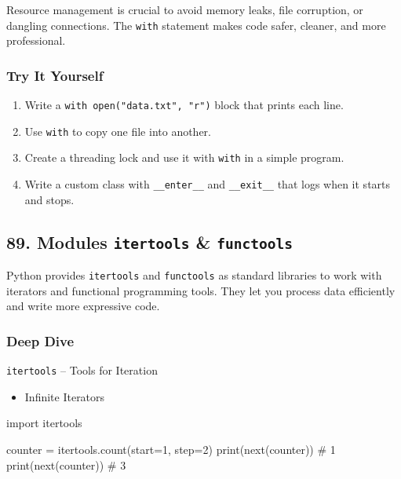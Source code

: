 \documentclass[
  letterpaper,
  DIV=11,
  numbers=noendperiod]{scrreprt}
\newenvironment{Shaded}{\begin{snugshade}}{\end{snugshade}}
\newcommand{\BuiltInTok}[1]{\textcolor[rgb]{0.00,0.23,0.31}{#1}}
\newcommand{\CommentTok}[1]{\textcolor[rgb]{0.37,0.37,0.37}{#1}}
\newcommand{\DecValTok}[1]{\textcolor[rgb]{0.68,0.00,0.00}{#1}}
\newcommand{\ImportTok}[1]{\textcolor[rgb]{0.00,0.46,0.62}{#1}}
\newcommand{\NormalTok}[1]{\textcolor[rgb]{0.00,0.23,0.31}{#1}}
\newcommand{\OperatorTok}[1]{\textcolor[rgb]{0.37,0.37,0.37}{#1}}
\providecommand{\tightlist}{%
  \setlength{\itemsep}{0pt}\setlength{\parskip}{0pt}}
\begin{document}
Resource management is crucial to avoid memory leaks, file corruption,
or dangling connections. The \texttt{with} statement makes code safer,
cleaner, and more professional.

\subsubsection{Try It Yourself}\label{try-it-yourself-87}

\begin{enumerate}
\def\labelenumi{\arabic{enumi}.}
\tightlist
\item
  Write a \texttt{with\ open("data.txt",\ "r")} block that prints each
  line.
\item
  Use \texttt{with} to copy one file into another.
\item
  Create a threading lock and use it with \texttt{with} in a simple
  program.
\item
  Write a custom class with \texttt{\_\_enter\_\_} and
  \texttt{\_\_exit\_\_} that logs when it starts and stops.
\end{enumerate}

\subsection{\texorpdfstring{89. Modules \texttt{itertools} \&
\texttt{functools}}{89. Modules itertools \& functools}}\label{modules-itertools-functools}

Python provides \texttt{itertools} and \texttt{functools} as standard
libraries to work with iterators and functional programming tools. They
let you process data efficiently and write more expressive code.

\subsubsection{Deep Dive}\label{deep-dive-88}

\texttt{itertools} -- Tools for Iteration

\begin{itemize}
\tightlist
\item
  Infinite Iterators
\end{itemize}

\begin{Shaded}
\begin{Highlighting}[]
\ImportTok{import}\NormalTok{ itertools}

\NormalTok{counter }\OperatorTok{=}\NormalTok{ itertools.count(start}\OperatorTok{=}\DecValTok{1}\NormalTok{, step}\OperatorTok{=}\DecValTok{2}\NormalTok{)}
\BuiltInTok{print}\NormalTok{(}\BuiltInTok{next}\NormalTok{(counter))  }\CommentTok{\# 1}
\BuiltInTok{print}\NormalTok{(}\BuiltInTok{next}\NormalTok{(counter))  }\CommentTok{\# 3}
\end{Highlighting}
\end{Shaded}
\end{document}
